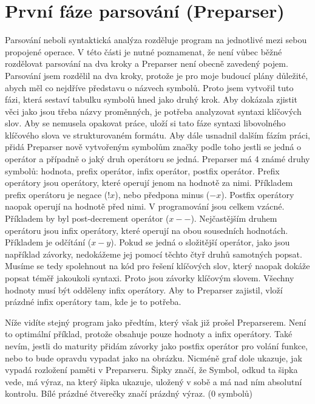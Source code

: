 \documentclass[12pt, a4paper, titlepage, abstract=on]{scrreprt}
\begin{document}
\section{První fáze parsování (Preparser)}
Parsování neboli syntaktická analýza rozděluje program na jednotlivé mezi sebou propojené operace. V této části je nutné poznamenat,
že není vůbec běžné rozdělovat parsování na dva kroky a Preparser není obecně zavedený pojem. Parsování jsem rozdělil na dva kroky,
protože je pro moje budoucí plány důležité, abych měl co nejdříve představu o názvech symbolů. Proto jsem vytvořil tuto fázi, která
sestaví tabulku symbolů hned jako druhý krok. Aby dokázala zjistit věci jako jsou třeba názvy proměnných, je potřeba analyzovat
syntaxi klíčových slov. Aby se nemusela opakovat práce, uloží si tato fáze syntaxi libovolného klíčového slova ve strukturovaném formátu.
Aby dále usnadnil dalším fázím práci, přidá Preparser nově vytvořeným symbolům značky podle toho jestli se jedná o operátor a případně
o jaký druh operátoru se jedná. Preparser má 4 známé druhy symbolů: hodnota, prefix operátor, infix operátor, postfix operátor. Prefix
operátory jsou operátory, které operují jenom na hodnotě za nimi. Příkladem prefix operátoru je negace ($!x$), nebo předpona minus ($-x$).
Postfix operátory naopak operují na hodnotě před nimi. V programování jsou celkem vzácné. Příkladem by byl post-decrement operátor ($x--$).
Nejčastějším druhem operátoru jsou infix operátory, které operují na obou sousedních hodnotách. Příkladem je odčítání ($x-y$). Pokud
se jedná o složitější operátor, jako jsou například závorky, nedokážeme jej pomocí těchto čtyř druhů samotných popsat. Musíme se
tedy spolehnout na kód pro řešení klíčových slov, který naopak dokáže popsat téměř jakoukoli syntaxi. Proto jsou závorky klíčovým slovem.
Všechny hodnoty musí být odděleny infix operátory. Aby to Preparser zajistil, vloží prázdné infix operátory tam, kde je to potřeba.

Níže vidíte stejný program jako předtím, který však již prošel Preparserem. Není to optimální příklad, protože obsahuje pouze hodnoty a infix operátory.
Také nevím, jestli do maturity přidám závorky jako postfix operátor pro volání funkce, nebo to bude opravdu vypadat jako na obrázku.
Nicméně graf dole ukazuje, jak vypadá rozložení paměti v Preparseru. Šipky značí, že Symbol, odkud ta šipka vede, má výraz, na který šipka
ukazuje, uložený v sobě a má nad ním absolutní kontrolu. Bílé prázdné čtverečky značí prázdný výraz. (0 symbolů)
\end{document}
